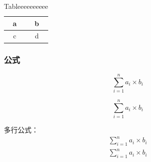 		\begin{table}[h!]
			\centering
				\caption{Tableeeeeeeeee}
				\label{tb:test_tb2}
				\begin{tabular}{c|c}
				a & b \\ \hline
				c & d \\ \hline
				\end{tabular}
			\end{table}
			
\subsubsection{公式}
	\begin{equation}\label{eq:test2}
	\sum_{i=1}^n a_i \times b_i 
	\end{equation}
	
	\begin{equation}
		\sum_{i=1}^n a_i \times b_i 
		\end{equation}
		
	多行公式：
	\begin{eqnarray}
			\sum_{i=1}^n a_i \times b_i  \nonumber \\
				\sum_{i=1}^n a_i \times b_i 
	\end{eqnarray}
